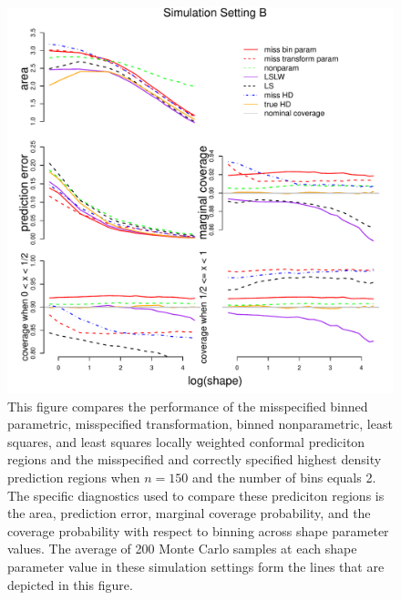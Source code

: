 \documentclass[11pt]{article}\usepackage[]{graphicx}\usepackage[]{color}
\makeatletter
\def\maxwidth{ %
  \ifdim\Gin@nat@width>\linewidth
    \linewidth
  \else
    \Gin@nat@width
  \fi
}
\newenvironment{knitrout}{}{} %
\makeatother
\begin{document}
\newpage
\begin{figure}[h!]
\begin{center}
\begin{knitrout}
\color{fgcolor}
\includegraphics[width=\maxwidth]{figure/Fig-misspec-150-1} 

\end{knitrout}
\end{center}
\caption{This figure compares the performance of the 
  misspecified binned parametric,
  misspecified transformation,  
  binned nonparametric,
  least squares, and 
  least squares locally weighted conformal prediciton regions and the 
  misspecified and correctly specified highest density prediction regions 
  when $n = 150$ and the number of bins equals 2.  
  The specific diagnostics used to compare these prediciton regions is the 
    area,
    prediction error, 
    marginal coverage probability, 
    and the coverage probability with respect to binning  
    across shape parameter values.
  The average of 200 Monte Carlo samples at each shape parameter value in 
  these simulation settings form the lines that are depicted in this figure.}
\label{Fig:misspec.150}
\end{figure}
\end{document}
